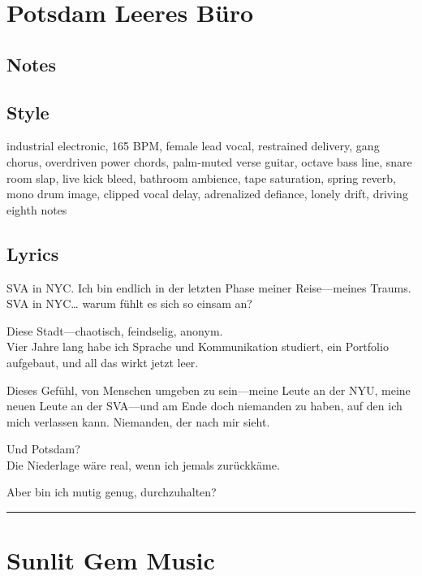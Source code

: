 \section{Potsdam Leeres Büro}\label{potsdam-leeres-buxfcro}

\subsection{Notes}\label{notes-26}

\subsection{Style}\label{style-25}

industrial electronic, 165 BPM, female lead vocal, restrained delivery,
gang chorus, overdriven power chords, palm-muted verse guitar, octave
bass line, snare room slap, live kick bleed, bathroom ambience, tape
saturation, spring reverb, mono drum image, clipped vocal delay,
adrenalized defiance, lonely drift, driving eighth notes

\subsection{Lyrics}\label{lyrics-25}

SVA in NYC. Ich bin endlich in der letzten Phase meiner Reise---meines
Traums.\\
SVA in NYC\ldots{} warum fühlt es sich so einsam an?

Diese Stadt---chaotisch, feindselig, anonym.\\
Vier Jahre lang habe ich Sprache und Kommunikation studiert, ein
Portfolio aufgebaut, und all das wirkt jetzt leer.

Dieses Gefühl, von Menschen umgeben zu sein---meine Leute an der NYU,
meine neuen Leute an der SVA---und am Ende doch niemanden zu haben, auf
den ich mich verlassen kann. Niemanden, der nach mir sieht.

Und Potsdam?\\
Die Niederlage wäre real, wenn ich jemals zurückkäme.

Aber bin ich mutig genug, durchzuhalten?

\begin{center}\rule{0.5\linewidth}{0.5pt}\end{center}

\section{Sunlit Gem Music}\label{sunlit-gem-music}

